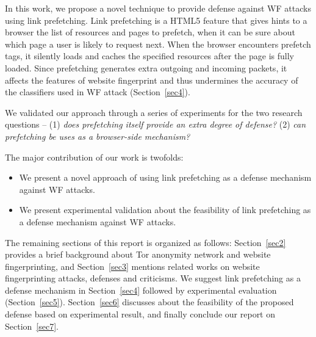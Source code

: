 In this work, we propose a novel technique to provide defense against WF attacks using link prefetching.
Link prefetching is a HTML5 feature that gives hints to a browser the list of resources and pages to prefetch, when it can be sure about which page a user is likely to request next.
When the browser encounters prefetch tags, it silently loads and caches the specified resources after the page is fully loaded.
Since prefetching generates extra outgoing and incoming packets, it affects the features of website fingerprint and thus undermines the accuracy of the classifiers used in WF attack (Section~\ref{sec4}).

We validated our approach through a series of experiments for the two research questions -- (1) {\it does prefetching itself provide an extra degree of defense?} (2) {\it can prefetching be uses as a browser-side mechanism?}


The major contribution of our work is twofolds:
\begin{itemize}
\item
We present a novel approach of using link prefetching as a defense mechanism against WF attacks.
\item 
We present experimental validation about the feasibility of link prefetching as a defense mechanism against WF attacks.
\end{itemize}

The remaining sections of this report is organized as follows: Section~\ref{sec2} provides a brief background about Tor anonymity network and website fingerprinting, and Section~\ref{sec3} mentions related works on website fingerprinting attacks, defenses and criticisms.
We suggest link prefetching as a defense mechanism in Section~\ref{sec4} followed by experimental evaluation (Section~\ref{sec5}).
Section~\ref{sec6} discusses about the feasibility of the proposed defense based on experimental result, and finally conclude our report on Section~\ref{sec7}.

